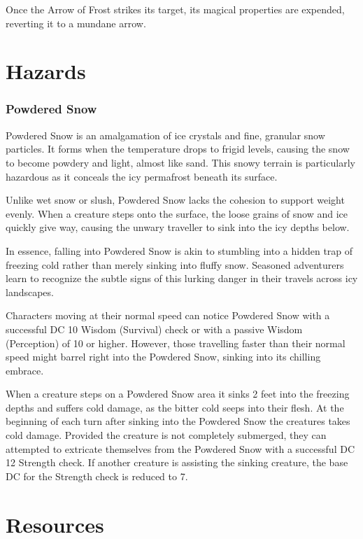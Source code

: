 Once the Arrow of Frost strikes its target, its magical properties are expended, reverting it to a mundane arrow.


\chapter{Hazards}
\subsection*{Powdered Snow}
Powdered Snow is an amalgamation of ice crystals and fine, granular snow particles. It forms when the temperature drops to frigid levels, causing the snow to become powdery and light, almost like sand. This snowy terrain is particularly hazardous as it conceals the icy permafrost beneath its surface.

Unlike wet snow or slush, Powdered Snow lacks the cohesion to support weight evenly. When a creature steps onto the surface, the loose grains of snow and ice quickly give way, causing the unwary traveller to sink into the icy depths below.

In essence, falling into Powdered Snow is akin to stumbling into a hidden trap of freezing cold rather than merely sinking into fluffy snow. Seasoned adventurers learn to recognize the subtle signs of this lurking danger in their travels across icy landscapes.

Characters moving at their normal speed can notice Powdered Snow with a successful DC 10 Wisdom (Survival) check or with a passive Wisdom (Perception) of 10 or higher. However, those travelling faster than their normal speed might barrel right into the Powdered Snow, sinking into its chilling embrace.

When a creature steps on a Powdered Snow area it sinks 2 feet into the freezing depths and suffers  cold damage, as the bitter cold seeps into their flesh. At the beginning of each turn after sinking into the Powdered Snow the creatures takes  cold damage. Provided the creature is not completely submerged, they can attempted to extricate themselves from the Powdered Snow with a successful DC 12 Strength check. If another creature is assisting the sinking creature, the base DC for the Strength check is reduced to 7.

\onecolumn
\chapter{Resources}
